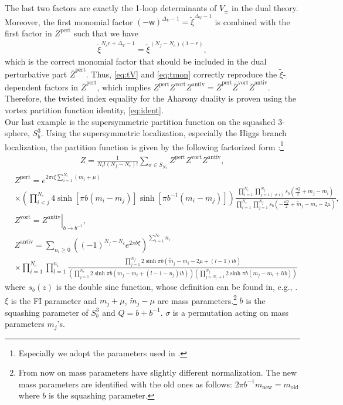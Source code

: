 \documentclass[a4paper,11pt]{article}
\begin{document}
The last two factors are exactly the 1-loop determinants of $V_\pm$ in the dual theory. Moreover, the first monomial factor $(-\mathsf w)^{\Delta_V-1} = \tilde \xi^{\Delta_V-1}$ is combined with the first factor in $Z^\text{pert}$ such that we have
\begin{align}
\label{eq:tmon}
\tilde \xi^{N_c r+\Delta_V-1} = \tilde \xi^{(N_f-N_c) (1-r)},
\end{align}
which is the correct monomial factor that should be included in the dual perturbative part $\bar Z^\text{pert}$. Thus, \eqref{eq:tV} and \eqref{eq:tmon} correctly reproduce the $\tilde \xi$-dependent factors in $\bar Z^\text{pert}$, which implies $Z^\text{pert} Z^\text{vort} Z^\text{antiv} = \bar Z^\text{pert} \bar Z^\text{vort} \bar Z^\text{antiv}$. Therefore, the twisted index equality for the Aharony duality is proven using the vortex partition function identity, \eqref{eq:ident}.
\\


Our last example is the supersymmetric partition function on the squashed 3-sphere, $S^3_b$. Using the supersymmetric localization, especially the Higgs branch localization, the partition function is given by the following factorized form \cite{Pasquetti:2011fj,Taki:2013opa,Fujitsuka:2013fga,Benini:2013yva}:\footnote{Especially we adopt the parameters used in \cite{Benini:2013yva}.}
\begin{align}
Z = \frac{1}{N_c! (N_f-N_c)!} \sum_{\sigma \in S_{N_c}} Z^\text{pert} Z^\text{vort} Z^\text{antiv},
\end{align}
\begin{align}
%
& Z^\text{pert} = e^{2 \pi i \xi \sum_{i = 1}^{N_c} (m_i+\mu)} \nonumber \\
%
& \times \left(\prod_{i < j}^{N_c} 4 \sinh [\pi b (m_i-m_j)] \sinh [\pi b^{-1} (m_i-m_j)]\right) \frac{\prod_{i = 1}^{N_c} \prod_{j = 1 (\neq i)}^{N_f} s_b(\frac{i Q}{2}+m_j-m_i)}{\prod_{i = 1}^{N_c} \prod_{j = 1}^{N_f} s_b(-\frac{i Q}{2}+\tilde m_j-m_i-2 \mu)}, \\
%
& Z^\text{vort} = \left.Z^\text{antiv}\right|_{b \rightarrow b^{-1}}, \\
%
& Z^\text{antiv} = \sum_{n_i \geq 0} \left((-1)^{N_f-N_c} e^{2 \pi b \xi}\right)^{\sum_{i = 1}^{N_c} n_i} \nonumber \\
%
& \times \prod_{i = 1}^{N_c} \prod_{l = 1}^{n_i} \frac{\prod_{j = 1}^{N_f} 2 \sinh \pi b (\tilde m_j-m_i-2 \mu+(l-1) i b)}{\left(\prod_{j = 1}^{N_c} 2 \sinh \pi b (m_j-m_i+(l-1-n_j) i b)\right) \left(\prod_{j = N_c+1}^{N_f} 2 \sinh \pi b (m_j-m_i+l i b)\right)}
%
\end{align}
where $s_b (z)$ is the double sine function, whose definition can be found in, e.g., \cite{Hama:2011ea}. $\xi$ is the FI parameter and $m_j+\mu$, $\tilde m_j-\mu$ are mass parameters.\footnote{From now on mass parameters have slightly different normalization. The new mass parameters are identified with the old ones as follows: $2 \pi b^{-1} m_\text{new} = m_\text{old}$ where $b$ is the squashing parameter.} $b$ is the squashing parameter of $S^3_b$ and $Q = b+b^{-1}$. $\sigma$ is a permutation acting on mass parameters $m_j$'s.
\end{document}
